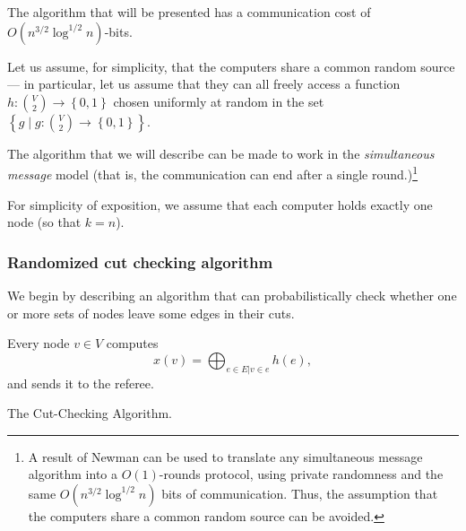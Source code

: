 The algorithm that will be presented has a communication cost of $O\left(n^{3/2} \log^{1/2} n\right)$-bits.

Let us assume, for simplicity, that the computers share a common random source --- in particular, let us assume that they can all freely access a  function $h: \binom{V}2 \rightarrow \left\{0,1\right\}$ chosen uniformly at random in the set $\left\{g \mid g: \binom{V}2 \rightarrow \left\{0,1\right\}\right\}$.

\smallskip

The algorithm \cite{cks15} that we will describe can be made to work in the {\em simultaneous message} model (that is, the communication can end after a single round.)\footnote{A result of Newman \cite{newman91} can be used to translate any simultaneous message algorithm into a $O(1)$-rounds protocol, using private randomness and the same $O\left(n^{3/2} \log^{1/2} n\right)$ bits of communication. Thus, the assumption that the computers share a common random source can be avoided.}

\smallskip

For simplicity of exposition, we assume that each computer holds exactly one node (so that $k = n$).

\subsubsection{Randomized cut checking algorithm}

We begin by describing an algorithm that can probabilistically check whether one or more sets of nodes leave some edges in their cuts.

\begin{algorithm}
Every node $v \in V$ computes $$x(v) = \bigoplus_{e \in E | v \in e} h(e),$$
and sends it to the referee.
\caption{\label{alg:cutcheck}The Cut-Checking Algorithm.}
\end{algorithm}

